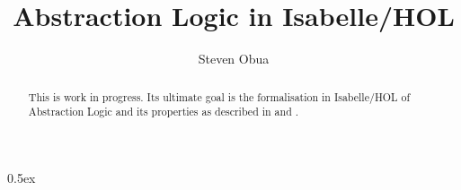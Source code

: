 \documentclass[11pt,a4paper]{article}
\begin{document}
\title{Abstraction Logic in Isabelle/HOL}
\author{Steven Obua}
\maketitle

\begin{abstract}
  This is work in progress. Its ultimate goal is the formalisation in Isabelle/HOL of Abstraction Logic and its properties as 
  described in \cite{Obua-pal.2} and \cite{Obua-abstraction.logic.2}.
\end{abstract}

\tableofcontents

\newpage

\parindent 0pt\parskip 0.5ex





\end{document}
